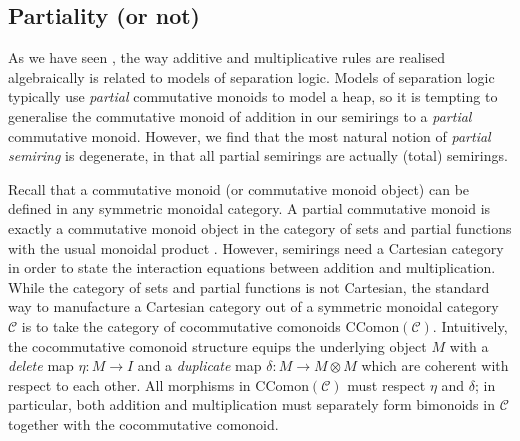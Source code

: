 \subsection{Partiality (or not)} 

As we have seen , the way additive and multiplicative rules are
realised algebraically is related to models of separation logic.
Models of separation logic typically use \emph{partial} commutative monoids to
model a heap, so it is tempting to generalise the commutative monoid of
addition in our semirings to a \emph{partial} commutative monoid.
However, we find that the most natural notion of \emph{partial semiring} is
degenerate, in that all partial semirings are actually (total) semirings.

Recall that a commutative monoid (or commutative monoid object) can be
defined in any symmetric monoidal category.
A partial commutative monoid is exactly a commutative monoid object in the
category of sets and partial functions with the usual monoidal product
.
However, semirings need a Cartesian category in order to state the interaction
equations between addition and multiplication.
While the category of sets and partial functions is not Cartesian, the
standard way to manufacture a Cartesian category out of a symmetric monoidal
category $\mathcal C$ is to take the category of cocommutative comonoids
$\mathrm{CComon}(\mathcal C)$.
Intuitively, the cocommutative comonoid structure equips the underlying
object $M$ with a \emph{delete} map $\eta : M \to I$ and a \emph{duplicate}
map $\delta : M \to M \otimes M$ which are coherent with respect to each other.
All morphisms in $\mathrm{CComon}(\mathcal C)$ must respect $\eta$ and
$\delta$; in particular, both addition and multiplication must separately
form bimonoids in $\mathcal C$ together with the cocommutative comonoid.

